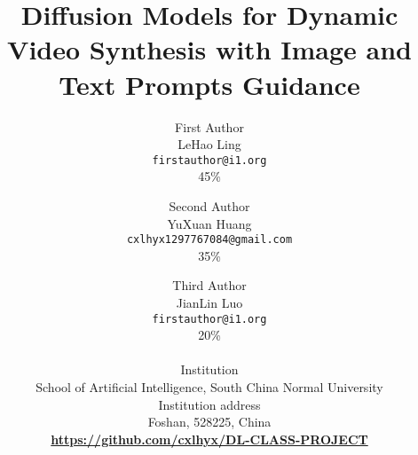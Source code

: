 \documentclass[10pt,twocolumn,letterpaper]{article}
\title{Diffusion Models for Dynamic Video Synthesis with Image and Text Prompts Guidance}
\author{
First Author\\LeHao Ling\\{\tt\small firstauthor@i1.org}\\45\%
\and
Second Author\\YuXuan Huang\\{\tt\small cxlhyx1297767084@gmail.com}\\35\%
\and
Third Author\\JianLin Luo\\{\tt\small firstauthor@i1.org}\\20\%
\\
\\Institution\\School of Artificial Intelligence, South China Normal University
\\Institution address\\Foshan, 528225, China
\\\hyperref[https://github.com/cxlhyx/DL-CLASS-PROJECT]{\textbf{https://github.com/cxlhyx/DL-CLASS-PROJECT}}
}
\begin{document}
    \maketitle
        
    
    
    
    
    
    

    \appendix
    
    {
        \small
        
        
    }
\end{document}
